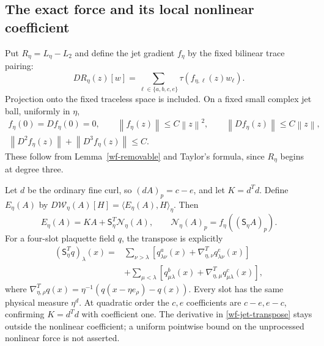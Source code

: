 \documentclass[11pt]{article}
\theoremstyle{remark}
\newcommand{\norm}[1]{\left\|#1\right\|}
\begin{document}
\subsection{The exact force and its local nonlinear coefficient}

Put $R_\eta=L_\eta-L_2$ and define the jet gradient $f_\eta$
by the fixed bilinear trace pairing:
\begin{equation}\label{wf-gradient-definition}
 DR_\eta(z)[w]=\sum_{\ell\in\{a,b,c,e\}}
                                \tau(f_{\eta,\ell}(z)w_\ell).
\end{equation}
Projection onto the fixed traceless space is included. On a
fixed small complex jet ball, uniformly in $\eta$,
\begin{equation}\label{wf-pointwise-bounds}
 \begin{gathered}
 f_\eta(0)=Df_\eta(0)=0,\qquad
 \norm{f_\eta(z)}\le C\norm{z}^2,\qquad
 \norm{Df_\eta(z)}\le C\norm{z},\\
 \norm{D^2f_\eta(z)}+\norm{D^3f_\eta(z)}\le C.
 \end{gathered}
\end{equation}
These follow from Lemma~\ref{wf-removable} and Taylor's
formula, since $R_\eta$ begins at degree three.

Let $d$ be the ordinary fine curl, so $(dA)_p=c-e$, and
let $K=d^Td$. Define $E_\eta(A)$ by
$D\mathcal W_\eta(A)[H]=\langle E_\eta(A),H\rangle_\eta$.
Then
\begin{equation}\label{wf-force-factorization}
 E_\eta(A)=KA+\mathsf S_\eta^T\mathcal N_\eta(A),
 \qquad
 \mathcal N_\eta(A)_p=f_\eta((\mathsf S_\eta A)_p).
\end{equation}
For a four-slot plaquette field $q$, the transpose is
explicitly
\begin{equation}\label{wf-jet-transpose}
 \begin{split}
 (\mathsf S_\eta^Tq)_\lambda(x)
 ={}&\sum_{\nu>\lambda}\left[
       q_{\lambda\nu}^{a}(x)
                +\nabla_{\eta,\nu}^Tq_{\lambda\nu}^{e}(x)\right]\\
 &+\sum_{\mu<\lambda}\left[
       q_{\mu\lambda}^{b}(x)
                +\nabla_{\eta,\mu}^Tq_{\mu\lambda}^{c}(x)\right],
 \end{split}
\end{equation}
where $\nabla_{\eta,\rho}^Tq(x)
=\eta^{-1}(q(x-\eta e_\rho)-q(x))$. Every slot has the same
physical measure $\eta^d$. At quadratic order the $c,e$
coefficients are $c-e,e-c$, confirming $K=d^Td$ with
coefficient one. The derivative in
\eqref{wf-jet-transpose} stays outside the nonlinear
coefficient; a uniform pointwise bound on the unprocessed
nonlinear force is not asserted.
\end{document}
